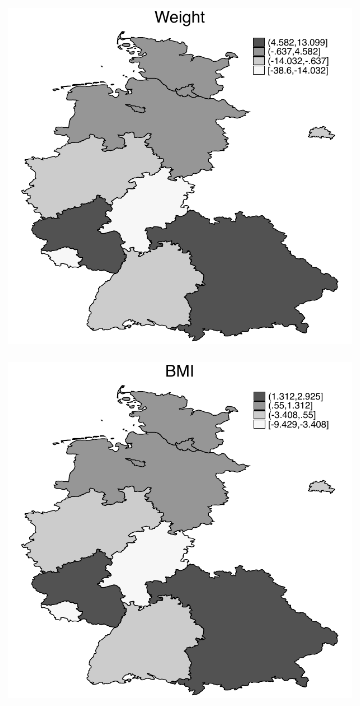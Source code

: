 \documentclass[a4paper ]{article}
\begin{document}
\begin{figure}[p]
\begin{subfigure}[h]{0.48\textwidth}
	\includegraphics[width=\textwidth]{../../analysis/graphs/SOEP/LOCWeight.pdf}
\end{subfigure}
\par\bigskip
\begin{subfigure}[h]{0.48\textwidth}\centering
	\includegraphics[width=\textwidth]{../../analysis/graphs/SOEP/LOCBMI.pdf}

\end{subfigure}
\end{figure}
\end{document}
